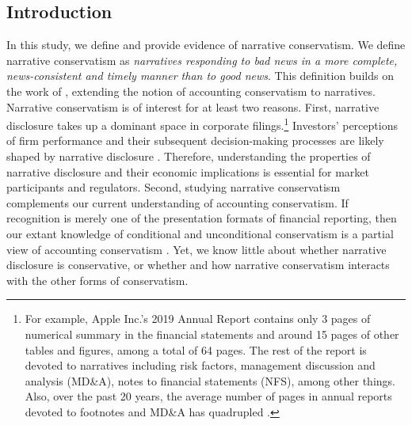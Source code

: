 \documentclass[letterpaper,11pt]{article}
\begin{document}
\begin{spacing}{1.5}
\section{Introduction}
\noindent In this study, we define and provide evidence of narrative conservatism. We define narrative conservatism as \textit{narratives responding to bad news in a more complete, news-consistent and timely manner than to good news}. This definition builds on the work of , extending the notion of accounting conservatism to narratives. Narrative conservatism is of interest for at least two reasons. First, narrative disclosure takes up a dominant space in corporate filings.\footnote{For example, Apple Inc.'s 2019 Annual Report contains only 3 pages of numerical summary in the financial statements and around 15 pages of other tables and figures, among a total of 64 pages. The rest of the report is devoted to narratives including risk factors, management discussion and analysis (MD\&A), notes to financial statements (NFS), among other things. Also, over the past 20 years, the average number of pages in annual reports devoted to footnotes and MD\&A has quadrupled \cite{eyPointNowTime2012}.} Investors' perceptions of firm performance and their subsequent decision-making processes are likely shaped by narrative disclosure \cite{liTextualAnalysisCorporate2011}. Therefore, understanding the properties of narrative disclosure and their economic implications is essential for market participants and regulators. Second, studying narrative conservatism complements our current understanding of accounting conservatism. If recognition is merely one of the presentation formats of financial reporting, then our extant knowledge of conditional and unconditional conservatism is a partial view of accounting conservatism \cite{kothariManagersWithholdBad2009, guayConservativeDisclosure2018}. Yet, we know little about whether narrative disclosure is conservative, or whether and how narrative conservatism interacts with the other forms of conservatism.


\end{spacing}
\end{document}
